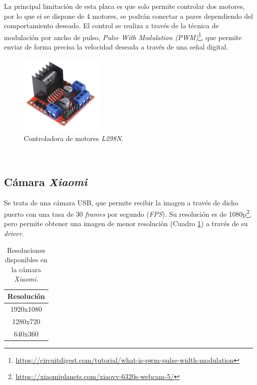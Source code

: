 La principal limitación de esta placa es que solo permite controlar dos motores, por lo que si se dispone de 4 motores, se podrán conectar a pares dependiendo del comportamiento deseado. El control se realiza a través de la técnica de modulación por ancho de pulso, \textit{Pulse With Modulation (PWM)}\footnote{\url{https://circuitdigest.com/tutorial/what-is-pwm-pulse-width-modulation}}, que permite enviar de forma precisa la velocidad deseada a través de una señal digital.\\

\begin{figure} [h!]
	\begin{center}
		\includegraphics[width=4cm]{figs/l298n}
	\end{center}
	\caption{Controladora de motores \textit{L298N}.}
	\label{fig:l298n}
\end{figure}\

\subsection{Cámara \textit{Xiaomi}}
\label{subsection:xiaomicamera}
Se trata de una cámara USB, que permite recibir la imagen a través de dicho puerto con una tasa de 30 \textit{frames} por segundo (\textit{FPS}). Su resolución es de 1080p\footnote{\url{https://xiaomiplanets.com/xiaovv-6320s-webcam-5/}}, pero permite obtener una imagen de menor resolución (Cuadro \ref{table:camera}) a través de su \textit{driver}.\\

\begin{table}[H]
	\begin{center}
		\begin{tabular}{|c|}
			\hline
			\textbf{Resolución}
			\\
			\hline
			1920x1080
			\\
			1280x720
			\\
			640x360
			\\
			\hline
		\end{tabular}
		\caption{Resoluciones disponibles en la cámara \textit{Xiaomi}.}
		\label{table:camera}
	\end{center}
\end{table}

